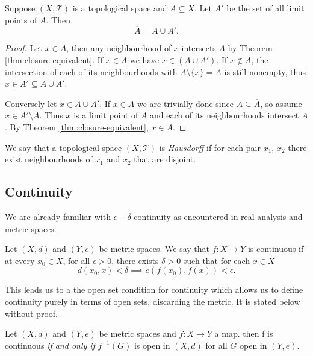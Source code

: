 
\begin{thm}
  \label{thm:limit-closure}
  Suppose $(X,\mathscr{T})$ is a topological space and $A \subseteq
  X$. Let $A'$ be the set of all limit points of $A$. Then
  \[
    \overline{A} = A \cup A'.
  \]
\end{thm}

\begin{proof}
  Let $x \in \overline{A}$, then any neighbourhood of $x$ intersects
  $A$ by Theorem \ref{thm:closure-equivalent}. If $x \in A$ we have $x
  \in (A \cup A')$. If $x \not\in A$, the intersection of each of its
  neighbourhoods with $A \setminus \{ x \} = A$ is still nonempty,
  thus $x \in A' \subseteq A \cup A'$. 

  Conversely let $x \in A \cup A'$, If $x \in A$ we are trivially done
  since $A \subseteq \overline{A}$, so assume $x \in A' \setminus
  A$. Thus $x$ is a limit point of $A$ and each of its neighbourhoods
  intersect $A$. By Theorem \ref{thm:closure-equivalent}, $x \in
  \overline{A}$.
\end{proof}

\begin{defn}
  We say that a topological space $(X, \mathscr{T})$ is
  \emph{Hausdorff} if for each pair $x_1$, $x_2$ there exist
  neighbourhoods of $x_1$ and $x_2$ that are disjoint.
\end{defn}

\subsection{Continuity}
\label{sec:prelims:continuity}

We are already familiar with $\epsilon-\delta$ continuity as
encountered in real analysis and metric spaces.

\begin{defn}
  Let $(X,d)$ and $(Y,e)$ be metric spaces. We say that $f: X
  \rightarrow Y$ is continuous if at every $x_0 \in X$, for all
  $\epsilon > 0$, there exists $\delta > 0$ such that for each $x \in
  X$
  \[
    d(x_0,x) < \delta \implies e(f(x_0),f(x)) < \epsilon.
  \]
\end{defn}

This leads us to a the open set condition for continuity which allows
us to define continuity purely in terms of open sets, discarding the
metric. It is stated below without proof.

\begin{thm}
  Let $(X,d)$ and $(Y,e)$ be metric spaces and $f:X \rightarrow Y$
  a map. then f is continuous \emph{if and only if} $f^{-1}(G)$ is open
  in $(X,d)$ for all $G$ open in $(Y,e)$.
\end{thm}

